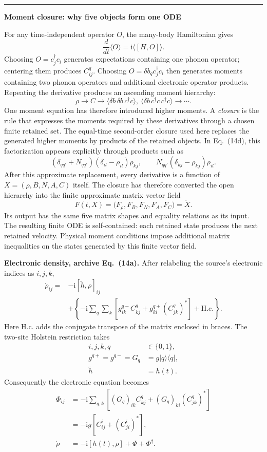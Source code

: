 \documentclass[10pt,letterpaper,twocolumn]{article}
\newcommand{\ii}{\mathrm i}
\newcommand{\tracebox}[3]{%
  \par\smallskip
  \noindent\begin{minipage}{\columnwidth}
    {\color{#1}\rule{\columnwidth}{1.1pt}}\par\vspace{-1pt}
    \small\textbf{\color{#1}#3}\par\smallskip\color{black}
}
\newcommand{\closetracebox}{%
  \par\vspace{1pt}{\color{navy!35}\rule{\columnwidth}{0.35pt}}
  \end{minipage}\par\smallskip
}
\begin{document}
\tracebox{navy}{paleblue}{Moment closure: why five objects form one ODE}
For any time-independent operator \(O\), the many-body Hamiltonian gives
\[
\frac{d}{dt}\langle O\rangle
=\ii\langle[H,O]\rangle.
\]
Choosing \(O=c_j^\dagger c_i\) generates expectations containing one phonon
operator; centering them produces \(C^q_{ij}\).  Choosing
\(O=\delta b_qc_j^\dagger c_i\) then generates moments containing two phonon
operators and additional electronic operator products.  Repeating the
derivative produces an ascending moment hierarchy:
\[
\rho\longrightarrow C
\longrightarrow
\langle\delta b\,\delta b\,c^\dagger c\rangle,
\ \langle\delta b\,c^\dagger c\,c^\dagger c\rangle
\longrightarrow\cdots .
\]
One moment equation has therefore introduced higher moments.  A
\emph{closure} is the rule that expresses the moments required by these
derivatives through a chosen finite retained set.  The equal-time
second-order closure used here replaces the generated higher moments by
products of the retained objects.  In Eq.~(14d), this factorization appears
explicitly through products such as
\[
(\delta_{qq'}+N_{qq'})(\delta_{il}-\rho_{il})\rho_{kj},
\qquad
N_{qq'}(\delta_{kj}-\rho_{kj})\rho_{il}.
\]
After this approximate replacement, every derivative is a function of
\(X=(\rho,B,N,A,C)\) itself.  The closure has therefore converted the open
hierarchy into the finite approximate matrix vector field
\[
F(t,X)
=\bigl(F_\rho,F_B,F_N,F_A,F_C\bigr)
=\dot X.
\]
Its output has the same five matrix shapes and equality relations as its input.
The resulting finite ODE is self-contained: each retained state produces the
next retained velocity.  Physical moment conditions impose additional matrix
inequalities on the states generated by this finite vector field.
\closetracebox

\textbf{Electronic density, archive Eq.~(14a).}
After relabeling the source's electronic indices as \(i,j,k\),
\[
\begin{aligned}
\dot\rho_{ij}={}&-\ii[\widetilde h,\rho]_{ij}\\
&+\left\{-\ii\sum_q\sum_k
\left[g^{q-}_{ik}C^q_{kj}
+g^{q+}_{ki}(C^q_{jk})^\ast\right]
+\mathrm{H.c.}\right\}.
\end{aligned}
\tag{14a}
\]
Here \(\mathrm{H.c.}\) adds the conjugate transpose of the matrix enclosed in
braces.  The two-site Holstein restriction takes
\[
\begin{aligned}
i,j,k,q&\in\{0,1\},\\
g^{q+}=g^{q-}=G_q&=g\lvert q\rangle\langle q\rvert,\\
\widetilde h&=h(t).
\end{aligned}
\tag{D1}
\]
Consequently the electronic equation becomes
\[
\begin{aligned}
\Phi_{ij}
&=-\ii\sum_{q,k}
\left[(G_q)_{ik}C^q_{kj}
+(G_q)_{ki}(C^q_{jk})^\ast\right]\\
&=-\ii g\left[C^i_{ij}+(C^i_{ji})^\ast\right],\\
\dot\rho&=-\ii[h(t),\rho]+\Phi+\Phi^\dagger.
\end{aligned}
\tag{D14a}
\]
\end{document}
